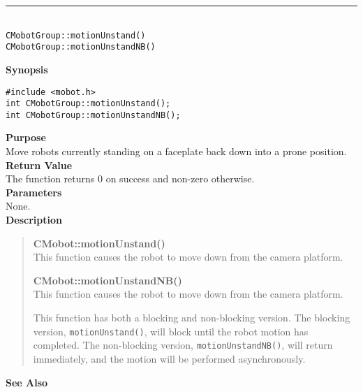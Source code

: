 \noindent
\vspace{5pt}
\rule{4.5in}{0.015in}\\
\noindent
{\LARGE \texttt{CMobotGroup::motionUnstand()}}\\
{\LARGE \texttt{CMobotGroup::motionUnstandNB()}}\\
{}

\noindent
{\bf Synopsis}
\vspace{-8pt}
\begin{verbatim}
#include <mobot.h>
int CMobotGroup::motionUnstand();
int CMobotGroup::motionUnstandNB();
\end{verbatim}

\noindent
{\bf Purpose}\\
Move robots currently standing on a faceplate back down into a prone position.\\

\noindent
{\bf Return Value}\\
The function returns 0 on success and non-zero otherwise.\\

\noindent
{\bf Parameters}\\
None.\\

\noindent
{\bf Description}\\
\vspace{-12pt}
\begin{quote}
{\bf CMobot::motionUnstand()}\\
This function causes the robot to move down from the camera platform.

{\bf CMobot::motionUnstandNB()}\\
This function causes the robot to move down from the camera platform.

This function has both a blocking and non-blocking version.
The blocking version, \texttt{motionUnstand()}, will block until the
robot motion has completed. The non-blocking version, \texttt{motionUnstandNB()},
will return immediately, and the motion will be performed asynchronously.\\
\end{quote}

\noindent
{\bf See Also}\\

